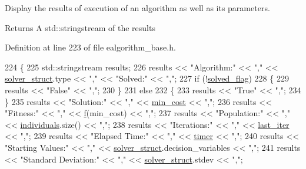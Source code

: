 Display the results of execution of an algorithm as well as its parameters. 

\begin{DoxyReturn}{Returns}
A std\+::stringstream of the results 
\end{DoxyReturn}


Definition at line 223 of file ealgorithm\+\_\+base.\+h.


\begin{DoxyCode}
224     \{
225         std::stringstream results;
226         results << \textcolor{stringliteral}{"Algorithm:"} << \textcolor{stringliteral}{","} << \hyperlink{classea_1_1_solver__base_a5e1d821809f2d26c6f882942ad728127}{solver\_struct}.type << \textcolor{stringliteral}{","} << \textcolor{stringliteral}{"Solved:"} << \textcolor{stringliteral}{","};
227         \textcolor{keywordflow}{if} (!\hyperlink{classea_1_1_solver__base_a1cdb824e8df6d4a8f228820ea85c9b05}{solved\_flag})
228         \{
229             results << \textcolor{stringliteral}{"False"} << \textcolor{stringliteral}{","};
230         \}
231         \textcolor{keywordflow}{else}
232         \{
233             results << \textcolor{stringliteral}{"True"} << \textcolor{stringliteral}{","};
234         \}
235         results << \textcolor{stringliteral}{"Solution:"} << \textcolor{stringliteral}{","} <<  \hyperlink{classea_1_1_solver__base_af745cded954be26280d842c1e7c7f989}{min\_cost} << \textcolor{stringliteral}{","};
236         results << \textcolor{stringliteral}{"Fitness:"} << \textcolor{stringliteral}{","} << \hyperlink{classea_1_1_solver__base_ae0a893780c93dfe17c1d17301de6494f}{f}(min\_cost) << \textcolor{stringliteral}{","};
237         results << \textcolor{stringliteral}{"Population:"} << \textcolor{stringliteral}{","} << \hyperlink{classea_1_1_solver__base_ad75bc440d24a46e97694c7c889f2ecde}{individuals}.size() << \textcolor{stringliteral}{","};
238         results << \textcolor{stringliteral}{"Iterations:"} << \textcolor{stringliteral}{","} << \hyperlink{classea_1_1_solver__base_a8f9a321eb87e57636cf0b0f3a57b6fc2}{last\_iter} << \textcolor{stringliteral}{","};
239         results << \textcolor{stringliteral}{"Elapsed Time:"} << \textcolor{stringliteral}{","} << \hyperlink{classea_1_1_solver__base_ab0f0690de4b612c20b40f1b69a0e2743}{timer} << \textcolor{stringliteral}{","};
240         results << \textcolor{stringliteral}{"Starting Values:"} << \textcolor{stringliteral}{","} << \hyperlink{classea_1_1_solver__base_a5e1d821809f2d26c6f882942ad728127}{solver\_struct}.decision\_variables << \textcolor{stringliteral}{","};
241         results << \textcolor{stringliteral}{"Standard Deviation:"} << \textcolor{stringliteral}{","} << \hyperlink{classea_1_1_solver__base_a5e1d821809f2d26c6f882942ad728127}{solver\_struct}.stdev << \textcolor{stringliteral}{","};

\end{DoxyCode}
